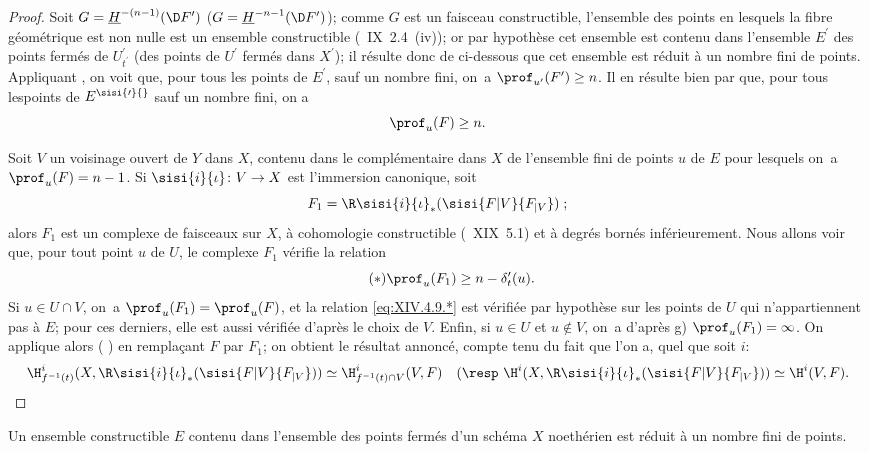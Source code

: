 \begin{proof}
Soit $G=\underline{H}^{-(n-1)}(\D F^{\prime})$ (\resp $G=\underline{H}^{-n-1}(\D F^{\prime})$); comme $G$ est un faisceau constructible, l'ensemble des points en lesquels la fibre g\'eom\'etrique est non nulle est un ensemble constructible (~IX~2.4~\textup{(iv)}); or par hypoth\`ese cet ensemble est contenu dans l'ensemble $E^{\prime}$ des points ferm\'es de $U_{t^{\prime}}^{\prime}$ (\resp des points de $U^{\prime}$ ferm\'es dans $X^{\prime}$); il r\'esulte donc de  ci-dessous que cet ensemble est r\'eduit \`a un nombre fini de points. Appliquant , on voit que, pour tous les points de $E^{\prime}$, sauf un nombre fini, on~a $\prof_{u^{\prime}}(F^{\prime})\geq n$. Il en r\'esulte bien par  que, pour tous les\pageoriginale points de $E^{\sisi{\prime}{}}$ sauf un nombre fini, on a
$$
\prof_{u}(F)\geq n.
$$

Soit $V$ un voisinage ouvert de $Y$ dans $X$, contenu dans le compl\'ementaire dans $X$ de l'ensemble fini de points $u$ de $E$ pour lesquels on~a $\prof_{u}(F)=n-1$. Si $\sisi{i}{\iota}\colon V\to X$ est l'immersion canonique, soit
$$F_{1}=\R \sisi{i}{\iota}_{\ast}(\sisi{F{|V}}{F_{|V}})\;;$$
alors $F_{1}$ est un complexe de faisceaux sur $X$, \`a cohomologie constructible (~XIX~5.1) et \`a degr\'es born\'es inf\'erieurement. Nous allons voir que, pour tout point $u$ de $U$, le complexe $F_{1}$ v\'erifie la relation
\begin{equation*} \label{eq:XIV.4.9.*} \tag{$*$}
\prof_{u}(F_{1})\geq n-\delta_{t}^{\prime}(u).
\end{equation*}
Si $u\in U\cap V$, on~a $\prof_{u}(F_{1})=\prof_{u}(F)$, et la
relation \eqref{eq:XIV.4.9.*} est v\'erifi\'ee par hypoth\`ese sur les
points de $U$ qui n'appartiennent pas \`a $E$; pour ces derniers,
elle est aussi v\'erifi\'ee d'apr\`es le choix de $V$. Enfin, si $u\in
U$ et $u\not\in V$, on~a d'apr\`es  g)
$\prof_{u}(F_{1})=\infty$. On applique alors  (\resp
{}) en rempla\c cant $F$ par $F_{1}$; on obtient le
r\'esultat annonc\'e, compte tenu du fait que l'on a, quel que soit
$i$:
$$
\H_{f^{-1}(t)}^{i}(X, \R \sisi{i}{\iota}_{\ast}(\sisi{F{|V}}{F_{|V}}))\simeq\H_{f^{-1}(t)\cap V}^{i}(V, F)\quad(\textrm{\resp }\H^{i}(X, \R \sisi{i}{\iota}_{\ast}(\sisi{F{|V}}{F_{|V}}))\simeq\H^{i}(V, F).
$$
\skipqed
\end{proof}

\begin{sublemme} \label{XIV.4.9.1} Un ensemble constructible $E$ contenu dans l'ensemble des points ferm\'es d'un sch\'ema $X$ noeth\'erien est r\'eduit \`a un nombre fini de points\pageoriginale.
\end{sublemme}

